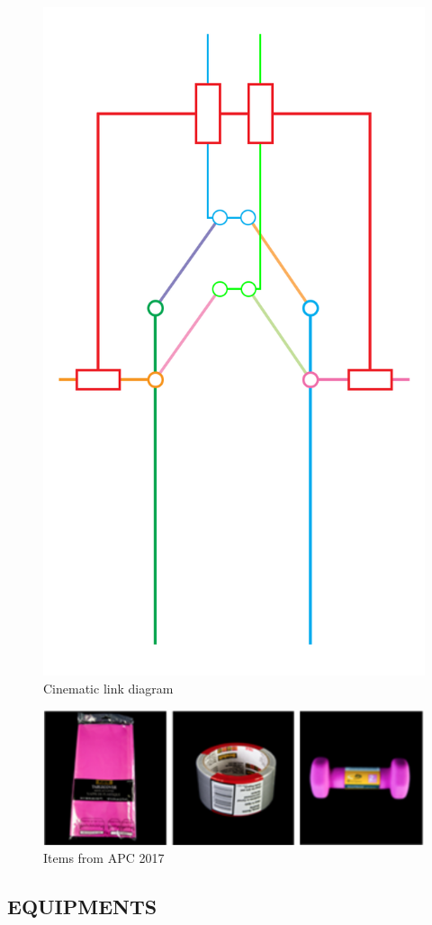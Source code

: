 \documentclass[letterpaper, 10 pt, conference]{ieeeconf}  %
\begin{document}
\begin{figure}[h]
\includegraphics[width=0.7\columnwidth]{cinematic}
\centering
\caption{Cinematic link diagram}
 \label{figure:cinematic}
\end{figure}

\begin{figure}[t]
\includegraphics[width=0.95\columnwidth]{items}
\centering
\caption{Items from APC 2017}
\label{figure:items}
\end{figure}

\newpage
\subsection{EQUIPMENTS}
\end{document}
